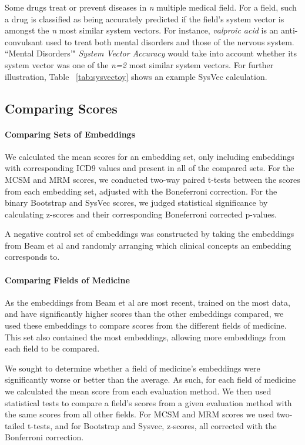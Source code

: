 \documentclass[11pt,a4paper]{article}
\begin{document}
Some drugs treat or prevent diseases in \emph{n} multiple medical field. For a field, such a drug is classified as being accurately predicted if the field's system vector is amongst the \emph{n} most similar system vectors. For instance, \emph{valproic acid} is an anti-convulsant used to treat both mental disorders and those of the nervous system. ``Mental Disorders'" \emph{System Vector Accuracy} would take into account whether its system vector was one of the \emph{n=2} most similar system vectors. For further illustration, Table ~\ref{tab:sysvectoy} shows an example SysVec calculation.



\subsection{Comparing Scores}

\paragraph{Comparing Sets of Embeddings}We calculated the mean scores for an embedding set, only including embeddings with corresponding ICD9 values and present in all of the compared sets. For the MCSM and MRM scores, we conducted two-way paired t-tests between the scores from each embedding set, adjusted with the Boneferroni correction. For the binary Bootstrap and SysVec scores, we judged statistical significance by calculating z-scores and their corresponding Boneferroni corrected p-values. 

A negative control set of embeddings was constructed by taking the embeddings from Beam et al  and randomly arranging which clinical concepts an embedding corresponds to. 

\paragraph{Comparing Fields of Medicine} As the embeddings from Beam et al  are most recent, trained on the most data, and have significantly higher scores than the other embeddings compared, we used these embeddings to compare scores from the different fields of medicine. This set also contained the most embeddings, allowing more embeddings from each field to be compared. 

We sought to determine whether a field of medicine's embeddings were significantly worse or better than the average. As such, for each field of medicine we calculated the mean score from each evaluation method. We then used statistical tests to compare a field's scores from a given evaluation method with the same scores from all other fields. For MCSM and MRM scores we used two-tailed t-tests, and for Bootstrap and Sysvec, z-scores, all corrected with the Bonferroni correction. 
\end{document}
